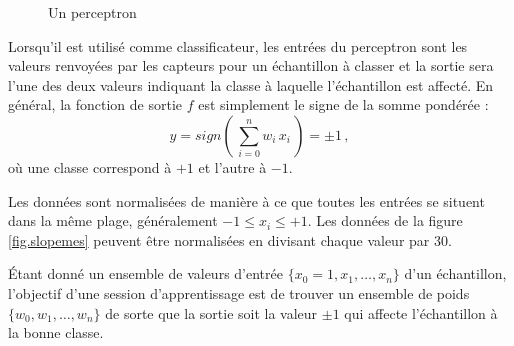 \begin{figure}
\begin{center}
\end{center}
\caption{Un perceptron}\label{fig.perceptron}
\end{figure}

Lorsqu'il est utilisé comme classificateur, les entrées du perceptron sont les valeurs renvoyées par les capteurs pour un échantillon à classer et la sortie sera l'une des deux valeurs indiquant la classe à laquelle l'échantillon est affecté. En général, la fonction de sortie $f$ est simplement le signe de la somme pondérée :
\begin{equation}
y=sign\left(\,\sum_{i=0}^{n} w_i\,x_i\,\right)=\pm 1\,,\label{eq.perceptron-output}
\end{equation}
où une classe correspond à $+1$ et l'autre à $-1$.

Les données sont normalisées de manière à ce que toutes les entrées se situent dans la même plage, généralement $-1\leq x_i\leq +1$. Les données de la figure \ref{fig.slopemes} peuvent être normalisées en divisant chaque valeur par $30$.

Étant donné un ensemble de valeurs d'entrée $\{x_0=1,x_1,\ldots,x_n\}$ d'un échantillon, l'objectif d'une session d'apprentissage est de trouver un ensemble de poids $\{w_0,w_1,\ldots,w_n\}$ de sorte que la sortie soit la valeur $\pm 1$ qui affecte l'échantillon à la bonne classe.


